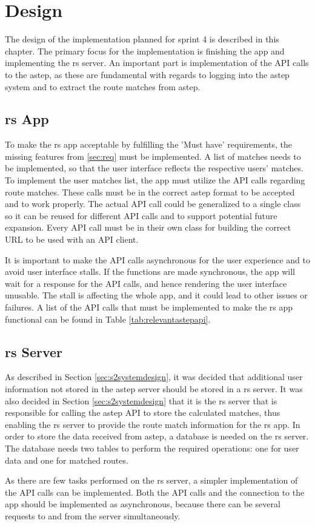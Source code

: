 \section{Design}
The design of the implementation planned for sprint 4 is described in this chapter.
The primary focus for the implementation is finishing the app and implementing the \gls{rs} server.
An important part is implementation of the API calls to the \gls{astep}, as these are fundamental with regards to logging into the \gls{astep} system and to extract the route matches from \gls{astep}.

\subsection{\gls{rs} App}
To make the \gls{rs} app acceptable by fulfilling the 'Must have' requirements, the missing features from \ref{sec:req} must be implemented.
A list of matches needs to be implemented, so that the user interface reflects the respective users' matches.
To implement the user matches list, the app must utilize the API calls regarding route matches.
These calls must be in the correct \gls{astep} format to be accepted and to work properly.
The actual API call could be generalized to a single class so it can be reused for different API calls and to support potential future expansion.
Every API call must be in their own class for building the correct URL to be used with an API client.

It is important to make the API calls asynchronous for the user experience and to avoid user interface stalls. 
If the functions are made synchronous, the app will wait for a response for the API calls, and hence rendering the user interface unusable.
The stall is affecting the whole app, and it could lead to other issues or failures.
A list of the API calls that must be implemented to make the \gls{rs} app functional can be found in Table \ref{tab:relevantastepapi}.

\subsection{\gls{rs} Server}
As described in Section \ref{sec:s2systemdesign}, it was decided that additional user information not stored in the \gls{astep} server should be stored in a \gls{rs} server.
It was also decided in Section \ref{sec:s2systemdesign} that it is the \gls{rs} server that is responsible for calling the \gls{astep} API to store the calculated matches, thus enabling the \gls{rs} server to provide the route match information for the \gls{rs} app.
In order to store the data received from \gls{astep}, a database is needed on the \gls{rs} server.
The database needs two tables to perform the required operations: one for user data and one for matched routes.

As there are few tasks performed on the \gls{rs} server, a simpler implementation of the API calls can be implemented.
Both the API calls and the connection to the app should be implemented as asynchronous, because there can be several requests to and from the server simultaneously. 